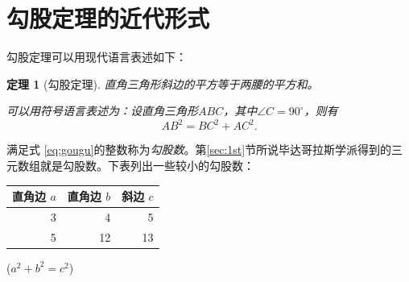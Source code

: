 \documentclass[UTF8]{ctexart}
\newtheorem{thm}{定理}
\begin{document}
\section{勾股定理的近代形式}
勾股定理可以用现代语言表述如下：
\begin{thm}[勾股定理]
直角三角形斜边的平方等于两腰的平方和。

可以用符号语言表述为：设直角三角形$ABC$，其中$\angle C=90^{\circ}$，则有
\begin{equation}\label{eq:gougu}
AB^{2}=BC^{2}+AC^{2}.
\end{equation}
\end{thm}
满足式 \eqref{eq:gougu}的整数称为\emph{勾股数}。第\ref{sec:1st}节所说毕达哥拉斯学派得到的三元数组就是勾股数。下表列出一些较小的勾股数：
\begin{table}[H]
\begin{tabular}{|rrr|}
\hline
直角边 $a$ & 直角边 $b$ & 斜边 $c$ \\
\hline
        3  &         4  &       5  \\
        5  &        12  &      13  \\
\hline
\end{tabular}%
\qquad
($a^2+b^2=c^2$)
\end{table}

\nocite{Shiye}

\end{document}

